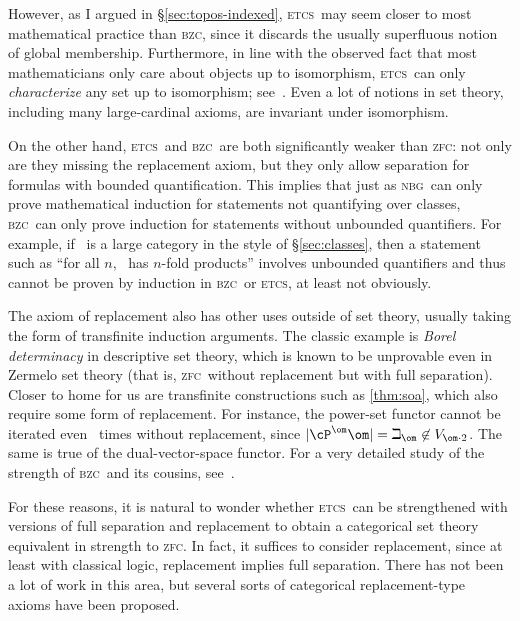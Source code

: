 \documentclass{amsart}
\def\zfc{\textsc{zfc}}
\def\nbg{\textsc{nbg}}
\def\etcs{\textsc{etcs}}
\def\bzc{\textsc{bzc}}
\begin{document}
However, as I argued in \S\ref{sec:topos-indexed}, \etcs\ may seem
closer to most mathematical practice than \bzc, since it discards the
usually superfluous notion of global membership.  Furthermore, in line
with the observed fact that most mathematicians only care about
objects up to isomorphism, \etcs\ can only \emph{characterize} any set
up to isomorphism; see~\cite{mclarty:numbers}.  Even a lot of notions
in set theory, including many large-cardinal axioms, are invariant
under isomorphism.

On the other hand, \etcs\ and \bzc\ are both significantly weaker than
\zfc: not only are they missing the replacement axiom, but they only
allow separation for formulas with bounded quantification.  This
implies that just as \nbg\ can only prove mathematical induction for
statements not quantifying over classes, \bzc\ can only prove
induction for statements without unbounded quantifiers.  For example,
if \bA\ is a large category in the style of \S\ref{sec:classes}, then
a statement such as ``for all $n$, \bA\ has $n$-fold products''
involves unbounded quantifiers and thus cannot be proven by induction
in \bzc\ or \etcs, at least not obviously.

The axiom of replacement also has other uses outside of set theory,
usually taking the form of transfinite induction arguments.  The
classic example is \emph{Borel determinacy} in descriptive set theory,
which is known to be unprovable even in Zermelo set theory (that is,
\zfc\ without replacement but with full separation).  Closer to home
for us are transfinite constructions such as \autoref{thm:soa}, which
also require some form of replacement.  For instance, the power-set
functor cannot be iterated even \om\ times without replacement, since
$|\cP^\om \om|=\beth_\om \not\in V_{\om\cdot 2}$.  The same is true of
the dual-vector-space functor.  For a very detailed study of the
strength of \bzc\ and its cousins, see~\cite{mathias:str-maclane}.

For these reasons, it is natural to wonder whether \etcs\ can be
strengthened with versions of full separation and replacement to
obtain a categorical set theory equivalent in strength to \zfc.  In
fact, it suffices to consider replacement, since at least with
classical logic, replacement implies full separation.  There has not
been a lot of work in this area, but several sorts of categorical
replacement-type axioms have been proposed.
\end{document}
